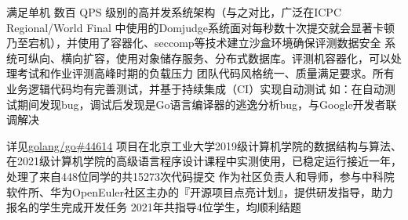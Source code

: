\documentclass{ctexrep}
\begin{document}
\begin{outline}
    \1 满足单机 数百 QPS 级别的高并发系统架构（与之对比，广泛在ICPC  Regional/World Final 中使用的Domjudge系统面对每秒数十次提交就会显著卡顿乃至宕机），并使用了容器化、seccomp等技术建立沙盒环境确保评测数据安全
    \1 系统可纵向、横向扩容，使用对象储存服务、分布式数据库。评测机容器化，可以处理考试和作业评测高峰时期的负载压力
    \1 团队代码风格统一、质量满足要求。所有业务逻辑代码均有完善测试，并基于持续集成（CI）实现自动测试
        \2 如：在自动测试期间发现bug，调试后发现是Go语言编译器的逃逸分析bug，与Google开发者联调解决
        
            详见\href{https://github.com/golang/go/issues/44614}{golang/go\#44614}
    \1 项目在北京工业大学2019级计算机学院的数据结构与算法、在2021级计算机学院的高级语言程序设计课程中实测使用，已稳定运行接近一年，处理了来自448位同学的共15273次代码提交
    \1 作为社区负责人和导师，参与中科院软件所、华为OpenEuler社区主办的『开源项目点亮计划』，提供研发指导，助力报名的学生完成开发任务
        \2 2021年共指导4位学生，均顺利结题
\end{outline}
\end{document}
